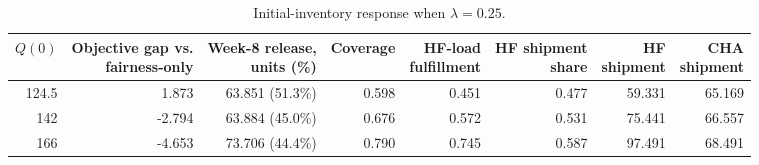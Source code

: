 \begin{table}[!ht]
    \centering
    \small
    \setlength{\tabcolsep}{4pt}
    \renewcommand{\arraystretch}{1.12}
    \caption{Initial-inventory response when $\lambda=0.25$.}
    \label{tab:initial_inventory_response}
    \begin{tabular}{rrrrrrrr}
    \toprule
    $Q(0)$ & \makecell{Objective gap vs.\\fairness-only} & \makecell{Week-8 release,\\ units (\%)} &  Coverage & \makecell{HF-load\\fulfillment} & \makecell{HF shipment\\share} & \makecell{HF\\shipment} & \makecell{CHA\\shipment}\\
    \midrule
    124.5 & 1.873 & 63.851 (51.3\%) & 0.598 & 0.451 & 0.477 & 59.331 & 65.169\\
    142   & -2.794 & 63.884 (45.0\%)  & 0.676 & 0.572 & 0.531 & 75.441 & 66.557 \\
    166   & -4.653 & 73.706 (44.4\%) & 0.790 & 0.745 & 0.587 & 97.491 & 68.491 \\
    \bottomrule
    \end{tabular}
\end{table}
